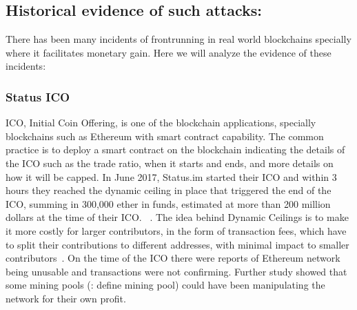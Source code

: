 \subsection{Historical evidence of such attacks:}\par\noindent
There has been many incidents of frontrunning in real world blockchains specially where it facilitates monetary gain. Here we will analyze the evidence of these incidents:





\subsubsection{Status ICO}
ICO, Initial Coin Offering, is one of the blockchain applications, specially blockchains such as Ethereum with smart contract capability. The common practice is to deploy a smart contract on the blockchain indicating the details of the ICO such as the trade ratio, when it starts and ends, and more details on how it will be capped.
In June 2017, Status.im started their ICO and within 3 hours they reached the dynamic ceiling in place that triggered the end of the ICO, summing in 300,000 ether in funds, estimated at more than 200 million dollars at the time of their ICO. ~\cite{statusicoanalysis}. The idea behind Dynamic Ceilings is to make it more costly for larger contributors,  in the form of transaction fees, which have to split their contributions to different addresses, with minimal impact to smaller contributors~\cite{statuswhitepaper}.
On the time of the ICO there were reports of Ethereum network being unusable and transactions were not confirming. Further study showed that some mining pools (\todo: define mining pool) could have been manipulating the network for their own profit.



